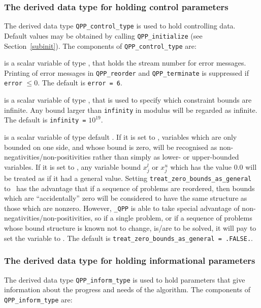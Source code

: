 \documentclass{galahad}
\newcommand{\packagename}{QPP}
\newcommand{\fullpackagename}{\libraryname\_\packagename}
\begin{document}

\subsubsection{The derived data type for holding control 
 parameters}\label{typecontrol}
The derived data type 
{\tt \packagename\_control\_type} 
is used to hold controlling data. Default values may be obtained by calling 
{\tt \packagename\_initialize}
(see Section~\ref{subinit}). The components of 
{\tt \packagename\_control\_type} 
are:

\begin{description}

 is a scalar variable of type \integer, that holds the
stream number for error messages. Printing of error messages in 
{\tt \packagename\_reorder} and {\tt \packagename\_terminate} 
is suppressed if {\tt error} $\leq 0$.
The default is {\tt error = 6}.

 is a scalar variable of type \realdp, that is used to
specify which constraint bounds are infinite.
Any bound larger than {\tt infinity} in modulus will be regarded as infinite.
The default is {\tt infinity =} $10^{19}$.

 is a scalar variable of type 
default \logical.
If it is set to \false, variables which 
are only bounded on one side, and whose bound is zero,
will be recognised as non-negativities/non-positivities rather than simply as
lower- or upper-bounded variables.
If it is set to \true, any variable bound 
$x_{j}^{l}$ or $x_{j}^{u}$ which has the value 0.0 will be
treated as if it had a general value.
Setting {\tt treat\_zero\_bounds\_as\_general} to \true\ has the advantage
that if a sequence of problems are reordered, then bounds which are
``accidentally'' zero will be considered to have the same structure as
those which are nonzero. However, {\tt \fullpackagename} is
able to take special advantage of non-negativities/non-positivities, so
if a single problem, or if a sequence of problems whose 
bound structure is known not to change, is/are to be solved, 
it will pay to set the variable to \false.
The default is {\tt treat\_zero\_bounds\_as\_general = .FALSE.}.

\end{description}


\subsubsection{The derived data type for holding informational
 parameters}\label{typeinform}
The derived data type 
{\tt \packagename\_inform\_type} 
is used to hold parameters that give information about the progress and needs 
of the algorithm. The components of 
{\tt \packagename\_inform\_type} 
are:
\end{document}
